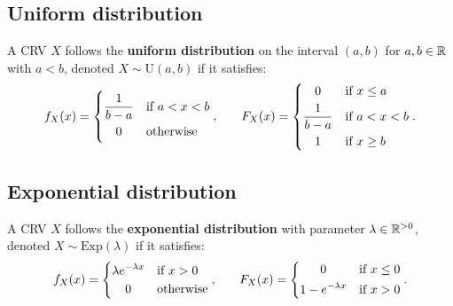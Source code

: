 \documentclass[../Year1/Year1.tex]{subfiles}
\begin{document}
\subsection{Uniform distribution}
\begingroup\belowdisplayskip=-10pt
\begin{definition}
    A CRV $X$ follows the \textbf{uniform distribution} on the interval $(a,b)$ for $a,b\in\mathbb{R}$ with $a<b$, denoted $X\sim \text{U}(a,b)$ if it satisfies: \[
        f_X(x) = \begin{dcases}
            \frac{1}{b-a} & \text{\textcolor{black}{if }$a<x<b$} \\
            \omit\hfil0\hfil & \text{\textcolor{black}{otherwise}}
        \end{dcases}\textcolor{black}{,}
        \qquad
        F_X(x) = \begin{dcases}
            \omit\hfil0\hfil & \text{\textcolor{black}{if }$x\leq a$} \\
            \frac{1}{b-a} & \text{\textcolor{black}{if }$a<x<b$} \\
            \omit\hfil1\hfil & \text{\textcolor{black}{if }$x\geq b$}
        \end{dcases}\textcolor{black}{.}
    \]
\end{definition}
\endgroup

\subsection{Exponential distribution}

\begingroup\belowdisplayskip=-10pt
\begin{definition}
    A CRV $X$ follows the \textbf{exponential distribution} with parameter $\lambda\in\mathbb{R}^{>0}$, denoted $X\sim \text{Exp}(\lambda)$ if it satisfies: \[
        f_X(x) = \begin{dcases}
            \lambda e^{-\lambda x} & \text{\textcolor{black}{if }$x>0$} \\
            \omit\hfil0\hfil & \text{\textcolor{black}{otherwise}}
        \end{dcases}\textcolor{black}{,}
        \qquad
        F_X(x) = \begin{dcases}
            \omit\hfil0\hfil & \text{\textcolor{black}{if }$x\leq0$} \\
            1-e^{-\lambda x} & \text{\textcolor{black}{if }$x>0$}
        \end{dcases}\textcolor{black}{.}
    \]
\end{definition}
\endgroup
\end{document}
